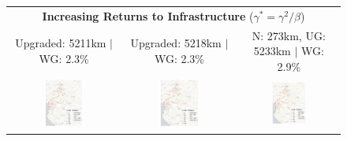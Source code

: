 \documentclass[a4paper]{article}
\begin{document}
\begin{figure}[H]
{\begin{tabular}{@{}c@{}c@{}c@{}}
\multicolumn{3}{c}{\textbf{Increasing Returns to Infrastructure} ($\gamma^* = \gamma^2/\beta$)} \\ [0.5em]
Upgraded: 5211km $|$ WG: 2.3\% & Upgraded: 5218km $|$ WG: 2.3\% & N: 273km, UG: 5233km $|$ WG: 2.9\% \\ 
\includegraphics[width=0.38\textwidth, trim= {0.9cm 0 0.9cm 0}, clip]{"../figures/GE/trans_africa_network_GE_20g_3200m_fixed_cgc_irs_sigma3.8_rho0_julia_MACR_90kmh_google_perc_ug.pdf"} & 
\includegraphics[width=0.38\textwidth, trim= {0.9cm 0 0.9cm 0}, clip]{"../figures/GE/trans_africa_network_GE_20g_3200m_fixed_cgc_irs_sigma3.8_rho2_julia_MACR_90kmh_google_perc_ug.pdf"} &
\includegraphics[width=0.38\textwidth, trim= {0.9cm 0 0.9cm 0}, clip]{"../figures/GE/trans_africa_network_GE_add_20g_3400m_fixed_cgc_irs_sigma3.8_rho0_julia_MACR_90kmh_google_perc_ug.pdf"} \\

\end{tabular}}
\end{figure}
\end{document}

